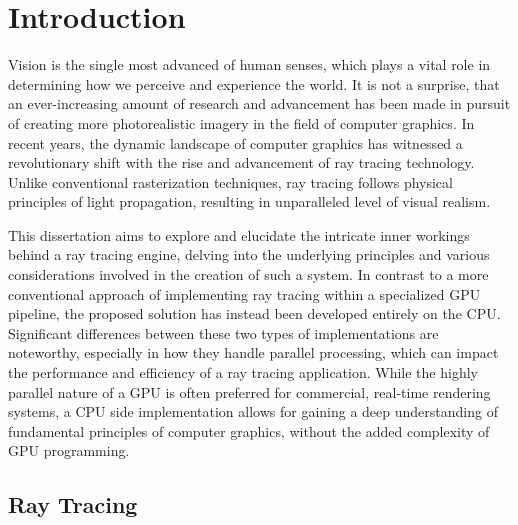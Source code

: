 
\chapter{Introduction} \label{ch:Introduction}

Vision is the single most advanced of human senses, which plays a vital role in determining how we perceive and experience the world.
It is not a surprise, that an ever-increasing amount of research and advancement has been made in pursuit of creating more photorealistic imagery in the field of computer graphics. 
In recent years, the dynamic landscape of computer graphics has witnessed a revolutionary shift with the rise and advancement of ray tracing technology. 
Unlike conventional rasterization techniques, ray tracing follows physical principles of light propagation, resulting in unparalleled level of visual realism. 

This dissertation aims to explore and elucidate the intricate inner workings behind a ray tracing engine, delving into the underlying principles and various considerations involved in the creation of such a system.
In contrast to a more conventional approach of implementing ray tracing within a specialized GPU pipeline, the proposed solution has instead been developed entirely on the CPU. 
Significant differences between these two types of implementations are noteworthy, especially in how they handle parallel processing, which can impact the performance and efficiency of a ray tracing application. 
While the highly parallel nature of a GPU is often preferred for commercial, real-time rendering systems, a CPU side implementation allows for gaining a deep understanding of fundamental principles of computer graphics, without the added complexity of GPU programming.

\section{Ray Tracing}

